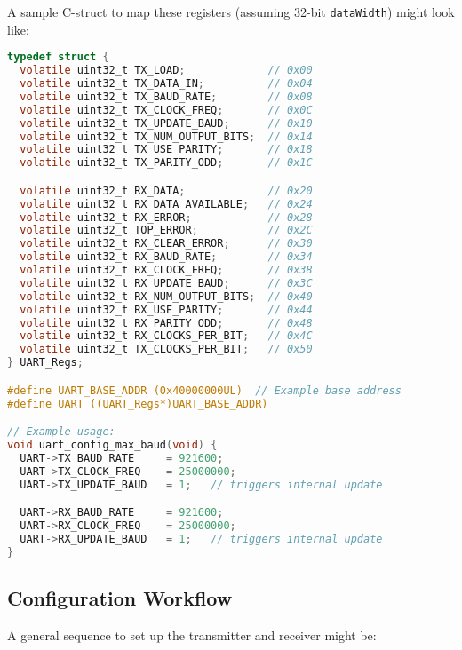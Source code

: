 A sample C-struct to map these registers (assuming 32-bit \texttt{dataWidth}) might look like:

\begin{lstlisting}[language=C,frame=single]
typedef struct {
  volatile uint32_t TX_LOAD;             // 0x00
  volatile uint32_t TX_DATA_IN;          // 0x04
  volatile uint32_t TX_BAUD_RATE;        // 0x08
  volatile uint32_t TX_CLOCK_FREQ;       // 0x0C
  volatile uint32_t TX_UPDATE_BAUD;      // 0x10
  volatile uint32_t TX_NUM_OUTPUT_BITS;  // 0x14
  volatile uint32_t TX_USE_PARITY;       // 0x18
  volatile uint32_t TX_PARITY_ODD;       // 0x1C

  volatile uint32_t RX_DATA;             // 0x20
  volatile uint32_t RX_DATA_AVAILABLE;   // 0x24
  volatile uint32_t RX_ERROR;            // 0x28
  volatile uint32_t TOP_ERROR;           // 0x2C
  volatile uint32_t RX_CLEAR_ERROR;      // 0x30
  volatile uint32_t RX_BAUD_RATE;        // 0x34
  volatile uint32_t RX_CLOCK_FREQ;       // 0x38
  volatile uint32_t RX_UPDATE_BAUD;      // 0x3C
  volatile uint32_t RX_NUM_OUTPUT_BITS;  // 0x40
  volatile uint32_t RX_USE_PARITY;       // 0x44
  volatile uint32_t RX_PARITY_ODD;       // 0x48
  volatile uint32_t RX_CLOCKS_PER_BIT;   // 0x4C
  volatile uint32_t TX_CLOCKS_PER_BIT;   // 0x50
} UART_Regs;

#define UART_BASE_ADDR (0x40000000UL)  // Example base address
#define UART ((UART_Regs*)UART_BASE_ADDR)

// Example usage:
void uart_config_max_baud(void) {
  UART->TX_BAUD_RATE     = 921600;
  UART->TX_CLOCK_FREQ    = 25000000;
  UART->TX_UPDATE_BAUD   = 1;   // triggers internal update

  UART->RX_BAUD_RATE     = 921600;
  UART->RX_CLOCK_FREQ    = 25000000;
  UART->RX_UPDATE_BAUD   = 1;   // triggers internal update
}
\end{lstlisting}

\subsection{Configuration Workflow}

A general sequence to set up the transmitter and receiver might be:

